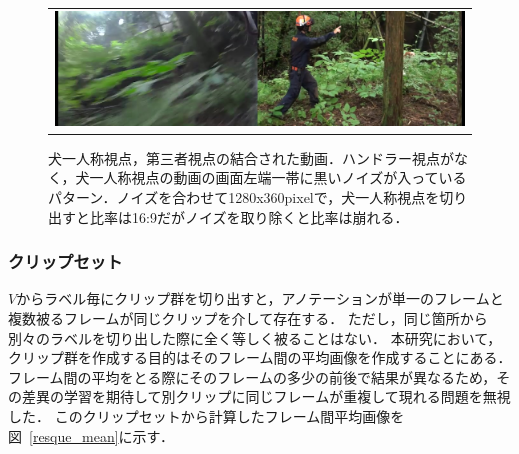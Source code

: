 \begin{enumerate}
\begin{end}
\begin{figure}[htbp]
\begin{tabular}{c}
\\
      \begin{minipage}{0.18\hsize}
        \begin{center}
          \includegraphics[clip, width=12cm]{./Figures/2015_gonta_3.eps}
        \end{center}
      \end{minipage}
    \end{tabular}
    \caption{犬一人称視点，第三者視点の結合された動画．ハンドラー視点がなく，犬一人称視点の動画の画面左端一帯に黒いノイズが入っているパターン．ノイズを合わせて1280x360pixelで，犬一人称視点を切り出すと比率は16:9だがノイズを取り除くと比率は崩れる．}
    \label{noizy_movie}
\end{figure}






\subsubsection{クリップセット}
$V$からラベル毎にクリップ群を切り出すと，アノテーションが単一のフレームと複数被るフレームが同じクリップを介して存在する．
ただし，同じ箇所から別々のラベルを切り出した際に全く等しく被ることはない．
本研究において，クリップ群を作成する目的はそのフレーム間の平均画像を作成することにある．
フレーム間の平均をとる際にそのフレームの多少の前後で結果が異なるため，その差異の学習を期待して別クリップに同じフレームが重複して現れる問題を無視した．
このクリップセットから計算したフレーム間平均画像を図~\ref{resque_mean}に示す．



\end{end}
\end{enumerate}
